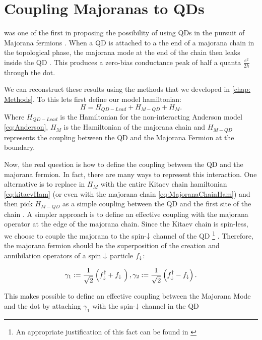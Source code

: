 
\section{Coupling Majoranas to QDs}
\citeauthor{liu_detecting_2011} was one of the first in proposing the possibility of using QDs in the pursuit of Majorana fermions . When a QD is attached to a the end of a majorana chain in the topological phase,  the majorana mode at the end of the chain then leaks inside the QD \cite{vernek_subtle_2014}. This produces a zero-bias conductance peak of half a quanta $\frac{e^{2}}{2h}$ through the dot.

 We can reconstruct these results using the methods that we developed in \ref{chap: Methods}. To this lets first define our model hamiltonian:
\begin{equation}
    H=H_{QD-Lead}+H_{M-QD}+H_M.
\end{equation}
Where $H_{QD-Lead}$ is the Hamiltonian for the non-interacting Anderson model \eqref{eq:Anderson}, $H_M$ is the Hamiltonian of the majorana chain and $H_{M-QD}$ represents the coupling between the QD and the Majorana Fermion at the boundary.

Now, the real question is how to define the coupling between the QD and the majorana fermion. In fact, there are many ways to represent this interaction. One alternative is to replace in $H_{M}$ with the entire Kitaev chain hamiltonian \eqref{eq:kitaevHam} (or  even with the  majorana chain \eqref{eq:MajoranaChainHam}) and then pick $H_{M-QD}$ as a simple coupling between the QD and the first site of the chain \cite{vernek_subtle_2014}.  A simpler approach is  to define an effective coupling with the majorana operator at the edge of the majorana chain. Since the Kitaev chain is spin-less, we choose to couple the majorana to the spin-$\downarrow$ channel of the QD \footnote{An appropriate justification of this fact can be found in \cite{ruiz-tijerina_interaction_2015}} . Therefore, the majorana fermion should be the superposition of the creation and annihilation operators of a spin $\downarrow$ particle $f_\downarrow$:

$$\gamma_1 := \frac{1}{\sqrt{2}} \left( f^\dagger_{\downarrow} + f_{\downarrow}\ \right) , \gamma_2 := \frac{1}{\sqrt{2}} \left( f^\dagger_{\downarrow} - f_{\downarrow} \right).$$

This makes possible to define an effective coupling between the Majorana Mode and the dot by attaching $\gamma_1$ with the spin-$\downarrow$ channel in the QD

